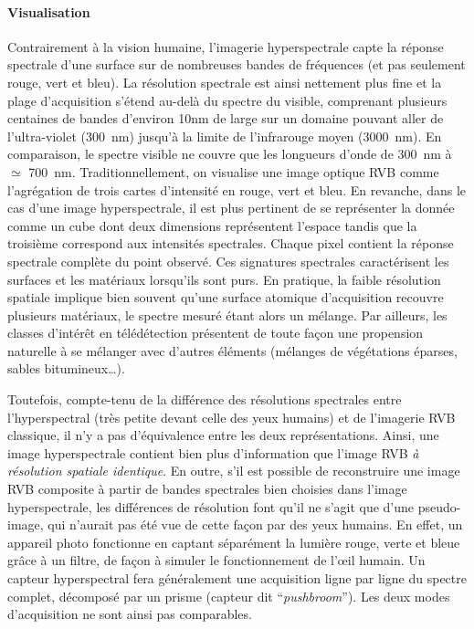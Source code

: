 \paragraph{Visualisation}
Contrairement à la vision humaine, l'imagerie hyperspectrale capte la réponse spectrale d'une surface sur de nombreuses bandes de fréquences (et pas seulement rouge, vert et bleu). La résolution spectrale est ainsi nettement plus fine et la plage d'acquisition s'étend au-delà du spectre du visible, comprenant plusieurs centaines de bandes d'environ 10nm de large sur un domaine pouvant aller de l'ultra-violet (\SI{300}{\nano\meter}) jusqu'à la limite de l'infrarouge moyen (\SI{3 000}{\nano\meter}). En comparaison, le spectre visible ne couvre que les longueurs d'onde de \SI{300}{\nano\meter} à $\simeq$ \SI{700}{\nano\meter}. Traditionnellement, on visualise une image optique \gls{RVB} comme l'agrégation de trois cartes d'intensité en rouge, vert et bleu. En revanche, dans le cas d'une image hyperspectrale, il est plus pertinent de se représenter la donnée comme un cube dont deux dimensions représentent l'espace tandis que la troisième correspond aux intensités spectrales. Chaque pixel contient la réponse spectrale complète du point observé. Ces signatures spectrales caractérisent les surfaces et les matériaux lorsqu'ils sont purs. En pratique, la faible résolution spatiale implique bien souvent qu'une surface atomique d'acquisition recouvre plusieurs matériaux, le spectre mesuré étant alors un mélange. Par ailleurs, les classes d'intérêt en télédétection présentent de toute façon une propension naturelle à se mélanger avec d'autres éléments (mélanges de végétations éparses, sables bitumineux\dots).

Toutefois, compte-tenu de la différence des résolutions spectrales entre l'hyperspectral (très petite devant celle des yeux humains) et de l'imagerie \gls{RVB} classique, il n'y a pas d'équivalence entre les deux représentations. Ainsi, une image hyperspectrale contient bien plus d'information que l'image \gls{RVB} \emph{à résolution spatiale identique}. En outre, s'il est possible de reconstruire une image \gls{RVB} composite à partir de bandes spectrales bien choisies dans l'image hyperspectrale, les différences de résolution font qu'il ne s'agit que d'une pseudo-image, qui n'aurait pas été vue de cette façon par des yeux humains. En effet, un appareil photo fonctionne en captant séparément la lumière rouge, verte et bleue grâce à un filtre, de façon à simuler le fonctionnement de l'\oe{}il humain. Un capteur hyperspectral fera généralement une acquisition ligne par ligne du spectre complet, décomposé par un prisme (capteur dit ``\textit{pushbroom}''). Les deux modes d'acquisition ne sont ainsi pas comparables.

